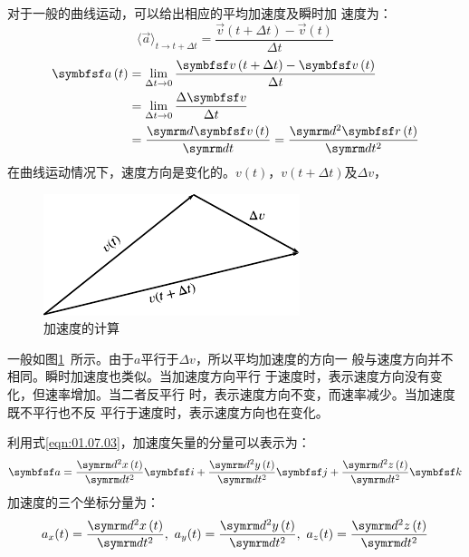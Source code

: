对于一般的曲线运动，可以给出相应的平均加速度及瞬时加
速度为：
\begin{equation}\label{eqn:01.08.02}
 \langle \vec{a} \rangle_{t \rightarrow t+\Delta t} = \frac{\vec{v}\left(t+\Delta t\right)-\vec{v}\left(t\right)}{\Delta t}
\end{equation}
\begin{equation}\label{eqn:01.08.03}
 \begin{aligned}
 \vec{a}\left(t\right) & =\lim _{\Delta t \rightarrow 0} \frac{\vec{v}\left(t+\Delta t\right)-\vec{v}\left(t\right)}{\Delta t} \\
 & =\lim_{\Delta t \rightarrow 0}\frac{\Delta \vec{v}}{\Delta t} \\
 & =\frac{\dif\vec{v}\left(t\right)}{\dif t}=\frac{\dif^2 \vec{r}\left(t\right)}{\dif t^2}
 \end{aligned}
\end{equation}
在曲线运动情况下，速度方向是变化的。$v\left(t\right)$，$v\left(t+\Delta t\right)$及$\Delta v$，
\begin{figure}
 \centering
 \small
 \includegraphics{figure/fig01.14}
 \caption{加速度的计算}
 \label{fig:01.14}
\end{figure}
一般如图\ref{fig:01.14}~所示。由于$a$平行于$\Delta v$，所以平均加速度的方向一
般与速度方向并不相同。瞬时加速度也类似。当加速度方向平行
于速度时，表示速度方向没有变化，但速率增加。当二者反平行
\clearpage\noindent
时，表示速度方向不变，而速率减少。当加速度既不平行也不反
平行于速度时，表示速度方向也在变化。

利用式\eqref{eqn:01.07.03}，加速度矢量的分量可以表示为：
\begin{equation}\label{eqn:01.08.04}
 \vec{a}=\frac{\dif^2x\left(t\right)}{\dif t^2}\vec{i}+\frac{\dif^2y\left(t\right)}{\dif t^2}\vec{j}+\frac{\dif^2z\left(t\right)}{\dif t^2}\vec{k}
\end{equation}
加速度的三个坐标分量为：
\setlength{\mathindent}{4em}
\begin{equation}\label{eqn:01.08.05}
 a_x(t)=\frac{\dif^2x\left(t\right)}{\dif t^2},~ a_y(t)=\frac{\dif^2y\left(t\right)}{\dif t^2},~
 a_z(t)=\frac{\dif^2z\left(t\right)}{\dif t^2}
\end{equation}
\setlength{\mathindent}{6em}

